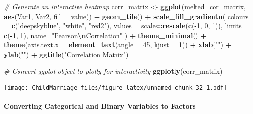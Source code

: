 \documentclass[
]{article}
\newenvironment{Shaded}{\begin{snugshade}}{\end{snugshade}}
\newcommand{\AttributeTok}[1]{\textcolor[rgb]{0.13,0.29,0.53}{#1}}
\newcommand{\CommentTok}[1]{\textcolor[rgb]{0.56,0.35,0.01}{\textit{#1}}}
\newcommand{\DecValTok}[1]{\textcolor[rgb]{0.00,0.00,0.81}{#1}}
\newcommand{\FunctionTok}[1]{\textcolor[rgb]{0.13,0.29,0.53}{\textbf{#1}}}
\newcommand{\NormalTok}[1]{#1}
\newcommand{\OtherTok}[1]{\textcolor[rgb]{0.56,0.35,0.01}{#1}}
\newcommand{\SpecialCharTok}[1]{\textcolor[rgb]{0.81,0.36,0.00}{\textbf{#1}}}
\newcommand{\StringTok}[1]{\textcolor[rgb]{0.31,0.60,0.02}{#1}}
\begin{document}
\begin{Shaded}
\begin{Highlighting}[]
\CommentTok{\# Generate an interactive heatmap}
\NormalTok{corr\_matrix }\OtherTok{\textless{}{-}} \FunctionTok{ggplot}\NormalTok{(melted\_cor\_matrix, }\FunctionTok{aes}\NormalTok{(Var1, Var2, }\AttributeTok{fill =}\NormalTok{ value)) }\SpecialCharTok{+}
    \FunctionTok{geom\_tile}\NormalTok{() }\SpecialCharTok{+}
    \FunctionTok{scale\_fill\_gradientn}\NormalTok{(}
        \AttributeTok{colours =} \FunctionTok{c}\NormalTok{(}\StringTok{"deepskyblue"}\NormalTok{, }\StringTok{"white"}\NormalTok{, }\StringTok{"red2"}\NormalTok{),}
        \AttributeTok{values =}\NormalTok{ scales}\SpecialCharTok{::}\FunctionTok{rescale}\NormalTok{(}\FunctionTok{c}\NormalTok{(}\SpecialCharTok{{-}}\DecValTok{1}\NormalTok{, }\DecValTok{0}\NormalTok{, }\DecValTok{1}\NormalTok{)),}
        \AttributeTok{limits =} \FunctionTok{c}\NormalTok{(}\SpecialCharTok{{-}}\DecValTok{1}\NormalTok{, }\DecValTok{1}\NormalTok{),}
        \AttributeTok{name=}\StringTok{"Pearson}\SpecialCharTok{\textbackslash{}n}\StringTok{Correlation"}
\NormalTok{    ) }\SpecialCharTok{+}
    \FunctionTok{theme\_minimal}\NormalTok{() }\SpecialCharTok{+} 
    \FunctionTok{theme}\NormalTok{(}\AttributeTok{axis.text.x =} \FunctionTok{element\_text}\NormalTok{(}\AttributeTok{angle =} \DecValTok{45}\NormalTok{, }\AttributeTok{hjust =} \DecValTok{1}\NormalTok{)) }\SpecialCharTok{+}
    \FunctionTok{xlab}\NormalTok{(}\StringTok{""}\NormalTok{) }\SpecialCharTok{+} 
    \FunctionTok{ylab}\NormalTok{(}\StringTok{""}\NormalTok{) }\SpecialCharTok{+}
    \FunctionTok{ggtitle}\NormalTok{(}\StringTok{"Correlation Matrix"}\NormalTok{) }

\CommentTok{\# Convert ggplot object to plotly for interactivity}
\FunctionTok{ggplotly}\NormalTok{(corr\_matrix)}
\end{Highlighting}
\end{Shaded}

\texttt{[image: ChildMarriage\_files/figure-latex/unnamed-chunk-32-1.pdf]}

\hypertarget{converting-categorical-and-binary-variables-to-factors}{%
\paragraph{Converting Categorical and Binary Variables to
Factors}\label{converting-categorical-and-binary-variables-to-factors}}
\end{document}
